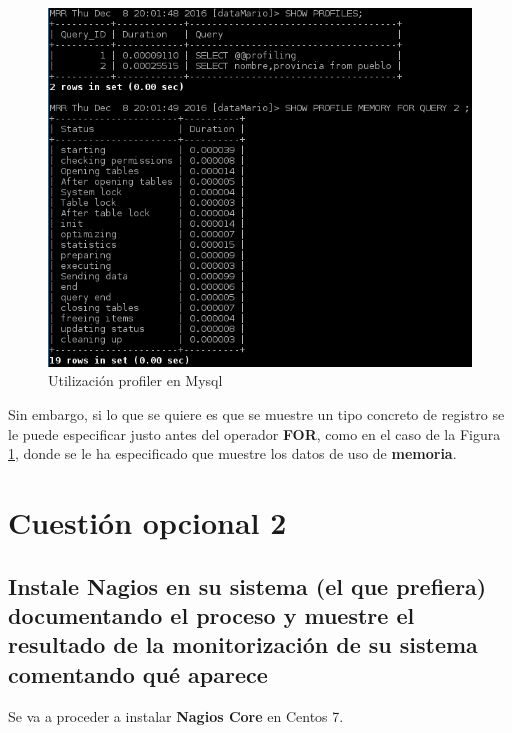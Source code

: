 \begin{figure}[H]
	\centering
	\includegraphics[scale=0.9]{figuras/ejercicio9/figura7.png} 
	\caption{Utilización profiler en Mysql} 
	\label{fig:figura96}
\end{figure}

Sin embargo, si lo que se quiere es que se muestre un tipo concreto de registro se le puede especificar justo antes del operador \textbf{FOR}, como en el caso de la Figura \ref{fig:figura96}, donde se le ha especificado que muestre los datos de uso de \textbf{memoria}.


\newpage


\section{Cuestión opcional 2}
\subsection{Instale Nagios en su sistema (el que prefiera)
	documentando el proceso y muestre el resultado de la monitorización de su
	sistema comentando qué aparece}

Se va a proceder a instalar \textbf{Nagios Core} en Centos 7. \cite{enlace12}

